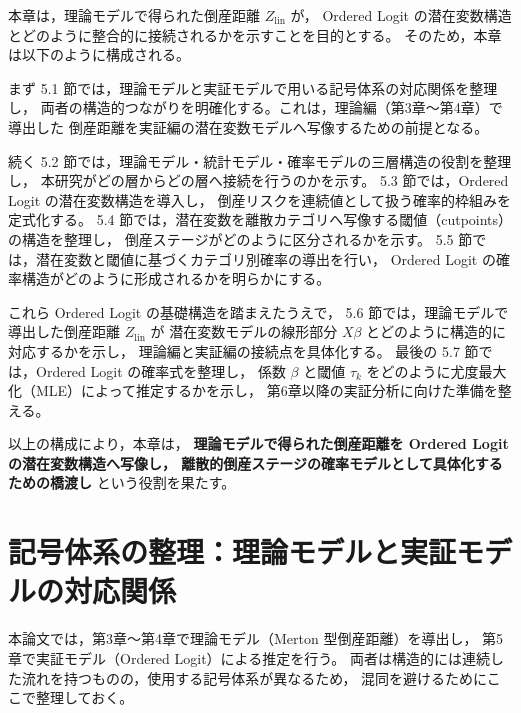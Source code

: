 本章は，理論モデルで得られた倒産距離 $Z_{\text{lin}}$ が，
Ordered Logit の潜在変数構造とどのように整合的に接続されるかを示すことを目的とする。
そのため，本章は以下のように構成される。

まず 5.1 節では，理論モデルと実証モデルで用いる記号体系の対応関係を整理し，
両者の構造的つながりを明確化する。これは，理論編（第3章〜第4章）で導出した
倒産距離を実証編の潜在変数モデルへ写像するための前提となる。

続く 5.2 節では，理論モデル・統計モデル・確率モデルの三層構造の役割を整理し，
本研究がどの層からどの層へ接続を行うのかを示す。
5.3 節では，Ordered Logit の潜在変数構造を導入し，
倒産リスクを連続値として扱う確率的枠組みを定式化する。
5.4 節では，潜在変数を離散カテゴリへ写像する閾値（cutpoints）の構造を整理し，
倒産ステージがどのように区分されるかを示す。
5.5 節では，潜在変数と閾値に基づくカテゴリ別確率の導出を行い，
Ordered Logit の確率構造がどのように形成されるかを明らかにする。

これら Ordered Logit の基礎構造を踏まえたうえで，
5.6 節では，理論モデルで導出した倒産距離 $Z_{\text{lin}}$ が
潜在変数モデルの線形部分 $X\beta$ とどのように構造的に対応するかを示し，
理論編と実証編の接続点を具体化する。
最後の 5.7 節では，Ordered Logit の確率式を整理し，
係数 $\beta$ と閾値 $\tau_k$ をどのように尤度最大化（MLE）によって推定するかを示し，
第6章以降の実証分析に向けた準備を整える。

以上の構成により，本章は，
\textbf{理論モデルで得られた倒産距離を Ordered Logit の潜在変数構造へ写像し，
離散的倒産ステージの確率モデルとして具体化するための橋渡し}
という役割を果たす。


\section{記号体系の整理：理論モデルと実証モデルの対応関係}
\label{sec:symbol_mapping}

本論文では，第3章〜第4章で理論モデル（Merton 型倒産距離）を導出し，
第5章で実証モデル（Ordered Logit）による推定を行う。
両者は構造的には連続した流れを持つものの，使用する記号体系が異なるため，
混同を避けるためにここで整理しておく。

